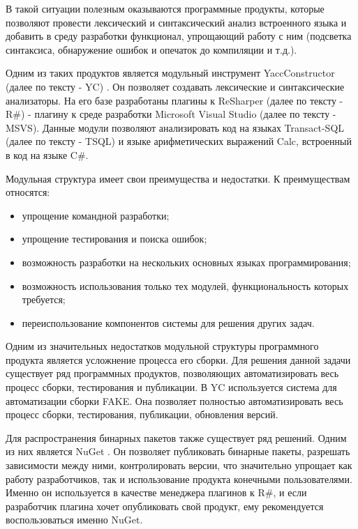 \documentclass{matmex-diploma}
\begin{document}
В такой ситуации полезным оказываются программные продукты, которые позволяют провести лексический и синтаксический анализ встроенного языка и добавить в среду разработки функционал, упрощающий работу с ним (подсветка синтаксиса, обнаружение ошибок и опечаток до компиляции и т.д.).

Одним из таких продуктов является модульный инструмент YaccConstructor (далее по тексту - YC) \cite{yc}. Он позволяет создавать лексические и синтаксические анализаторы. На его базе разработаны плагины к ReSharper (далее по тексту - R\#) \cite{resharper} - плагину к среде разработки Microsoft Visual Studio (далее по тексту - MSVS). Данные модули позволяют анализировать код на языках Transact-SQL (далее по тексту - TSQL) и языке арифметических выражений Calc, встроенный в код на языке C\#.

Модульная структура имеет свои преимущества и недостатки. К преимуществам относятся:

\begin{itemize}
\item
упрощение командной разработки;
\item
упрощение тестирования и поиска ошибок;
\item
возможность разработки на нескольких основных языках программирования;
\item
возможность использования только тех модулей, функциональность которых требуется;
\item
переиспользование компонентов системы для решения других задач.
\end{itemize}

Одним из значительных недостатков модульной структуры программного продукта является усложнение процесса его сборки. Для решения данной задачи существует ряд программных продуктов, позволяющих автоматизировать весь процесс сборки, тестирования и публикации. В YC используется система для автоматизации сборки FAKE. Она позволяет полностью автоматизировать весь процесс сборки, тестирования, публикации, обновления версий.

Для распространения бинарных пакетов также существует ряд решений. Одним из них является NuGet \cite{nuget}. Он позволяет публиковать бинарные пакеты, разрешать зависимости между ними, контролировать версии, что значительно упрощает как работу разработчиков, так и использование продукта конечными пользователями. Именно он используется в качестве менеджера плагинов к R\#, и если разработчик плагина хочет опубликовать свой продукт, ему рекомендуется воспользоваться именно NuGet.
\end{document}
